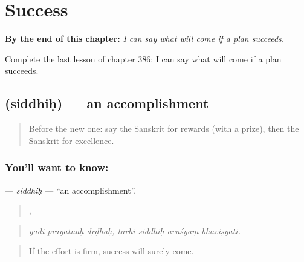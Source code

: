 
\chapter{Success}
\label{ch:sa-success}

\begin{chapteropening}
\textbf{By the end of this chapter:} \emph{I can say what will come if a plan succeeds.}

Complete the last lesson of chapter 386: I can say what will come if a plan succeeds.
\end{chapteropening}

\section[\texorpdfstring{\sk{सिद्धिः} (siddhiḥ)}{सिद्धिः (siddhiḥ)}]{ (siddhiḥ) — an accomplishment}

\label{lesson:SA-C386-siddhih}



\begin{quote}
Before the new one: say the Sanskrit for rewards (with a prize), then the Sanskrit for excellence.
\end{quote}

\subsection*{You'll want to know: }
\textbf{} — \emph{siddhiḥ} — \textquotedblleft{}an accomplishment\textquotedblright{}.

\begin{quote}
  ,    
\end{quote}

\begin{quote}
\emph{yadi prayatnaḥ dṛḍhaḥ, tarhi siddhiḥ avaśyaṃ bhaviṣyati.}
\end{quote}

\begin{quote}
If the effort is firm, success will surely come.
\end{quote}

